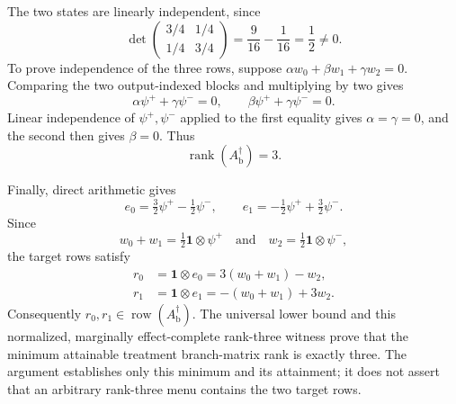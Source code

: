 The two states are linearly independent, since
\[
 \det\begin{pmatrix}3/4&1/4\\[2pt]1/4&3/4\end{pmatrix}
 =\frac{9}{16}-\frac{1}{16}=\frac12\ne0.
\]
To prove independence of the three rows, suppose
\(\alpha w_0+\beta w_1+\gamma w_2=0\).  Comparing the two output-indexed
blocks and multiplying by two gives
\[
 \alpha\psi^{+}+\gamma\psi^{-}=0,
 \qquad
 \beta\psi^{+}+\gamma\psi^{-}=0.
\]
Linear independence of \(\psi^{+},\psi^{-}\) applied to the first equality
gives \(\alpha=\gamma=0\), and the second then gives \(\beta=0\).  Thus
\[
 \operatorname{rank}(A_{\mathrm b}^{\dagger})=3.
\]

Finally, direct arithmetic gives
\[
 e_0=\tfrac32\psi^{+}-\tfrac12\psi^{-},
 \qquad
 e_1=-\tfrac12\psi^{+}+\tfrac32\psi^{-}.
\]
Since
\[
 w_0+w_1=\tfrac12\mathbf 1\otimes\psi^{+}
 \quad\text{and}\quad
 w_2=\tfrac12\mathbf 1\otimes\psi^{-},
\]
the target rows satisfy
\[
 \begin{aligned}
 r_0&=\mathbf 1\otimes e_0
     =3(w_0+w_1)-w_2,\\
 r_1&=\mathbf 1\otimes e_1
     =-(w_0+w_1)+3w_2.
 \end{aligned}
\]
Consequently \(r_0,r_1\in\operatorname{row}(A_{\mathrm b}^{\dagger})\).
The universal lower bound and this normalized, marginally effect-complete
rank-three witness prove that the minimum attainable treatment branch-matrix
rank is exactly three.  The argument establishes only this minimum and its
attainment; it does not assert that an arbitrary rank-three menu contains
the two target rows.